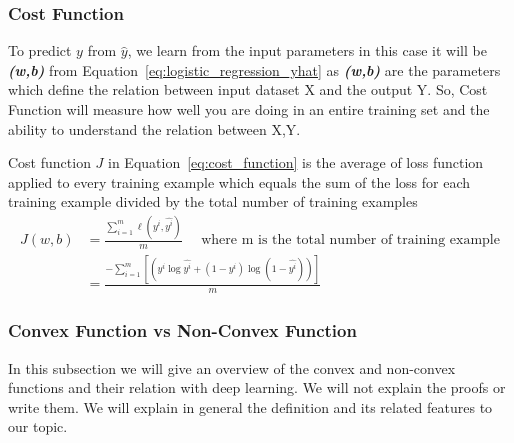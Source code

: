 \subsubsection{Cost Function}
To predict $y$ from $\widehat{y}$, we learn from the input parameters in this case it will be \textbf{\textit{(w,b)}} from Equation~\eqref{eq:logistic_regression_yhat} as \textbf{\textit{(w,b)}} are the parameters which define the relation between input dataset X and the output Y. So, Cost Function will measure how well you are doing in an entire training set and the ability to understand the relation between X,Y.

Cost function \textbf{\textit{$J$}} in Equation~\eqref{eq:cost_function} is the average of loss function applied to every training example which equals the sum of the loss for each training example divided by the total number of training examples%
%
\begin{equation}\label{eq:cost_function}
 \begin{split}
 J(w,b) & = \frac{\sum_{i=1}^{m} \ell(y^i,\widehat{y^i})}{m} \quad \text{ where m is the total number of training example} \\
 & = \frac {- \sum_{i=1}^{m} [(y^i \log \widehat{y^i} + (1-y^i) \log (1-\widehat{y^i}))]}{m} 
 \end{split}
\end{equation}%
%
\subsubsection{Convex Function vs Non-Convex Function }

In this subsection we will give an overview of the convex and non-convex functions and their relation with deep learning. We will not explain the proofs or write them. We will explain in general the definition and its related features to our topic.

